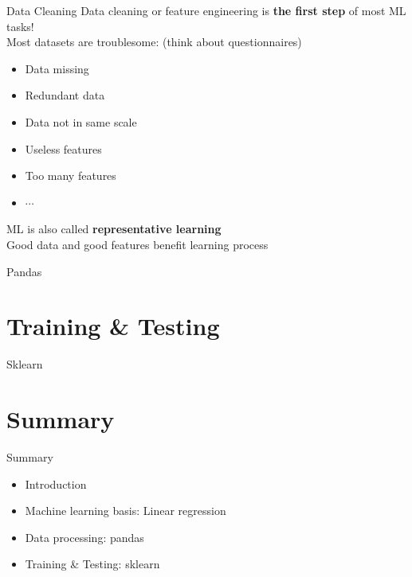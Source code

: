 \documentclass{../TexTemplate/myslide}
\begin{document}
\begin{frame}{Data Cleaning}
Data cleaning or feature engineering is \textbf{the first step} of most ML tasks!\\
Most datasets are troublesome: (think about questionnaires)
\begin{itemize}
	\item Data missing
	\item Redundant data
	\item Data not in same scale
	\item Useless features
	\item Too many features
	\item $\cdots$
\end{itemize}
ML is also called \textbf{representative learning}\\
Good data and good features benefit learning process
\end{frame}

\begin{frame}{Pandas}

\end{frame}

\section{Training \& Testing}
\begin{frame}
\sectionpage
\end{frame}

\begin{frame}{Sklearn}

\end{frame}

\section{Summary}
\begin{frame}
\sectionpage
\end{frame}

\begin{frame}{Summary}
\begin{itemize}
	\item Introduction
	\item Machine learning basis: Linear regression
	\item Data processing: pandas
	\item Training \& Testing: sklearn
\end{itemize}
\end{frame}
\end{document}
